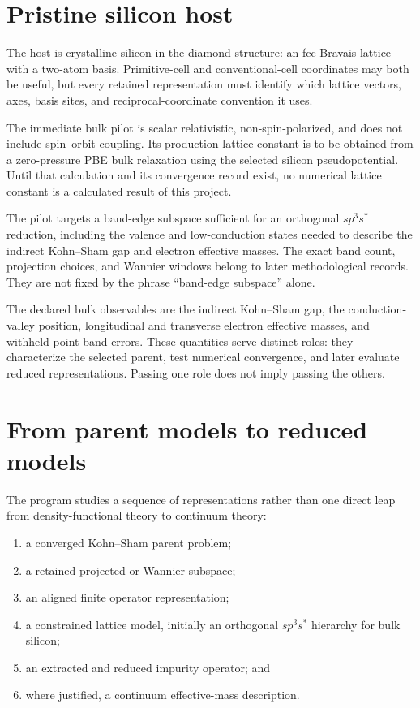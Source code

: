 \section{Pristine silicon host}


The host is crystalline silicon in the diamond structure: an fcc Bravais
lattice with a two-atom basis. Primitive-cell and conventional-cell
coordinates may both be useful, but every retained representation must
identify which lattice vectors, axes, basis sites, and reciprocal-coordinate
convention it uses.

The immediate bulk pilot is scalar relativistic, non-spin-polarized, and does
not include spin--orbit coupling. Its production lattice constant is to be
obtained from a zero-pressure PBE bulk relaxation using the selected silicon
pseudopotential. Until that calculation and its convergence record exist, no
numerical lattice constant is a calculated result of this project.

The pilot targets a band-edge subspace sufficient for an orthogonal
$sp^3s^{\ast}$ reduction, including the valence and low-conduction states
needed to describe the indirect Kohn--Sham gap and electron effective masses.
The exact band count, projection choices, and Wannier windows belong to later
methodological records. They are not fixed by the phrase ``band-edge
subspace'' alone.

The declared bulk observables are the indirect Kohn--Sham gap, the
conduction-valley position, longitudinal and transverse electron effective
masses, and withheld-point band errors. These quantities serve distinct roles:
they characterize the selected parent, test numerical convergence, and later
evaluate reduced representations. Passing one role does not imply passing the
others.

\section{From parent models to reduced models}


The program studies a sequence of representations rather than one direct leap
from density-functional theory to continuum theory:
\begin{enumerate}
    \item a converged Kohn--Sham parent problem;
    \item a retained projected or Wannier subspace;
    \item an aligned finite operator representation;
    \item a constrained lattice model, initially an orthogonal
          $sp^3s^{\ast}$ hierarchy for bulk silicon;
    \item an extracted and reduced impurity operator; and
    \item where justified, a continuum effective-mass description.
\end{enumerate}

